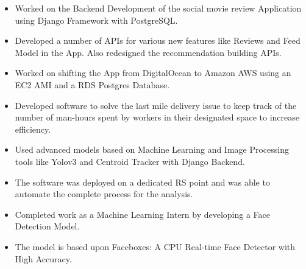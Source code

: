 \documentclass[11pt,b4paper,ragged2e]{altacv}
\begin{document}
    
\begin{itemize}
    \item Worked on the Backend Development of the social movie review Application using Django Framework with PostgreSQL.
    \item Developed a number of APIs for various new features like Reviews and Feed Model in the App. Also redesigned the recommendation building APIs.
    \item Worked on shifting the App from DigitalOcean to Amazon AWS using an EC2 AMI and a RDS Postgres Database.
    \end{itemize} \medskip
    
\begin{itemize}
    \item Developed software to solve the last mile delivery issue to keep track of the number of man-hours spent by workers in their designated space to increase efficiency.
    \item Used advanced models based on Machine Learning and Image Processing tools like Yolov3 and Centroid Tracker with Django Backend.
    \item The software was deployed on a dedicated RS point and was able to automate the complete process for the analysis.
    \end{itemize} \medskip
    
\begin{itemize}
    \item Completed work as a Machine Learning Intern by developing a Face Detection Model.
    \item The model is based upon Faceboxes: A CPU Real-time Face Detector with High Accuracy.
\end{itemize}




\end{document}
